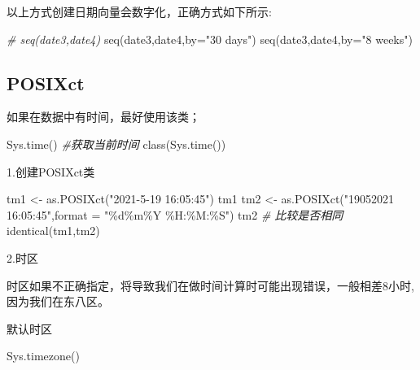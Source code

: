 \documentclass[
]{book}
\newenvironment{Shaded}{\begin{snugshade}}{\end{snugshade}}
\newcommand{\AttributeTok}[1]{\textcolor[rgb]{0.77,0.63,0.00}{#1}}
\newcommand{\CommentTok}[1]{\textcolor[rgb]{0.56,0.35,0.01}{\textit{#1}}}
\newcommand{\FunctionTok}[1]{\textcolor[rgb]{0.00,0.00,0.00}{#1}}
\newcommand{\NormalTok}[1]{#1}
\newcommand{\OtherTok}[1]{\textcolor[rgb]{0.56,0.35,0.01}{#1}}
\newcommand{\StringTok}[1]{\textcolor[rgb]{0.31,0.60,0.02}{#1}}
\begin{document}
以上方式创建日期向量会数字化，正确方式如下所示:

\begin{Shaded}
\begin{Highlighting}[]
\CommentTok{\# seq(date3,date4)}
\FunctionTok{seq}\NormalTok{(date3,date4,}\AttributeTok{by=}\StringTok{"30 days"}\NormalTok{)}
\FunctionTok{seq}\NormalTok{(date3,date4,}\AttributeTok{by=}\StringTok{"8 weeks"}\NormalTok{)}
\end{Highlighting}
\end{Shaded}

\hypertarget{the-POSIXct-class}{%
\subsection{POSIXct}\label{the-POSIXct-class}}

如果在数据中有时间，最好使用该类；

\begin{Shaded}
\begin{Highlighting}[]
\FunctionTok{Sys.time}\NormalTok{() }\CommentTok{\#获取当前时间}
\FunctionTok{class}\NormalTok{(}\FunctionTok{Sys.time}\NormalTok{())}
\end{Highlighting}
\end{Shaded}

1.创建POSIXct类

\begin{Shaded}
\begin{Highlighting}[]
\NormalTok{tm1 }\OtherTok{\textless{}{-}} \FunctionTok{as.POSIXct}\NormalTok{(}\StringTok{"2021{-}5{-}19 16:05:45"}\NormalTok{)}
\NormalTok{tm1}
\NormalTok{tm2 }\OtherTok{\textless{}{-}} \FunctionTok{as.POSIXct}\NormalTok{(}\StringTok{"19052021 16:05:45"}\NormalTok{,}\AttributeTok{format =} \StringTok{"\%d\%m\%Y \%H:\%M:\%S"}\NormalTok{)}
\NormalTok{tm2}
\CommentTok{\# 比较是否相同}
\FunctionTok{identical}\NormalTok{(tm1,tm2)}
\end{Highlighting}
\end{Shaded}

2.时区

时区如果不正确指定，将导致我们在做时间计算时可能出现错误，一般相差8小时,因为我们在东八区。

默认时区

\begin{Shaded}
\begin{Highlighting}[]
\FunctionTok{Sys.timezone}\NormalTok{()}
\end{Highlighting}
\end{Shaded}
\end{document}
